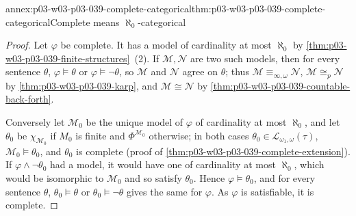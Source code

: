 \begin{annexitem}{annex:p03-w03-p03-039-complete-categorical}{thm:p03-w03-p03-039-complete-categorical}{Complete means \(\aleph_0\)-categorical}
\begin{proof}
Let \(\varphi\) be complete. It has a model of cardinality at most
\(\aleph_0\) by \cref{thm:p03-w03-p03-039-finite-structures}~(2). If
\(\mathcal M,\mathcal N\) are two such models, then for every sentence
\(\theta\), \(\varphi\models\theta\) or \(\varphi\models\neg\theta\), so
\(\mathcal M\) and \(\mathcal N\) agree on \(\theta\); thus
\(\mathcal M\equiv_{\infty,\omega}\mathcal N\), \(\mathcal M\cong_p\mathcal N\)
by \cref{thm:p03-w03-p03-039-karp}, and
\(\mathcal M\cong\mathcal N\) by \cref{thm:p03-w03-p03-039-countable-back-forth}.

Conversely let \(\mathcal M_0\) be the unique model of \(\varphi\) of
cardinality at most \(\aleph_0\), and let \(\theta_0\) be
\(\chi_{\mathcal M_0}\) if \(M_0\) is finite and \(\Phi^{\mathcal M_0}\)
otherwise; in both cases \(\theta_0\in\mathcal L_{\omega_1,\omega}(\tau)\),
\(\mathcal M_0\models\theta_0\), and \(\theta_0\) is complete (proof of
\cref{thm:p03-w03-p03-039-complete-extension}). If \(\varphi\wedge\neg\theta_0\)
had a model, it would have one of cardinality at most \(\aleph_0\), which
would be isomorphic to \(\mathcal M_0\) and so satisfy \(\theta_0\). Hence
\(\varphi\models\theta_0\), and for every sentence \(\theta\),
\(\theta_0\models\theta\) or \(\theta_0\models\neg\theta\) gives the same for
\(\varphi\). As \(\varphi\) is satisfiable, it is complete.
\end{proof}
\end{annexitem}

